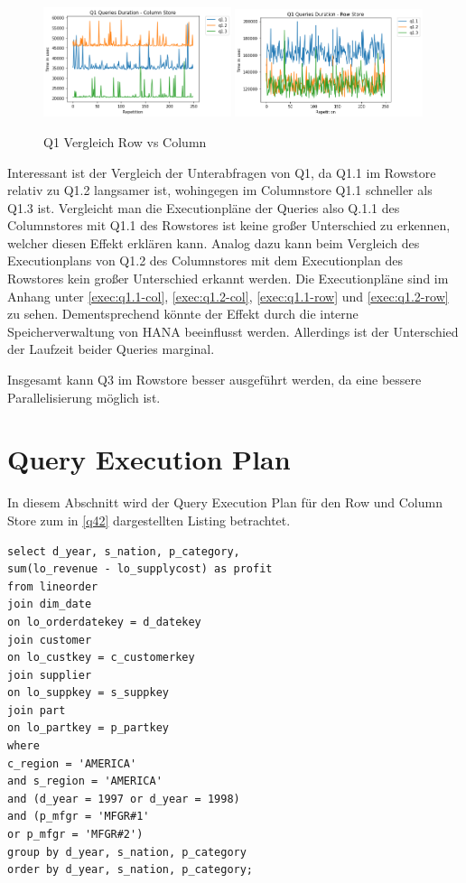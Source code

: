 \begin{figure}[H]
	\centering
	\includegraphics[width=0.49\textwidth]{images/q1-col.png}
	\includegraphics[width=0.49\textwidth]{images/q1-row.png}
	\caption{Q1 Vergleich Row vs Column}\label{auswertung:comp:q1}
\end{figure}

Interessant ist der Vergleich der Unterabfragen von Q1, da Q1.1
im Rowstore relativ zu Q1.2 langsamer ist, wohingegen im Columnstore
Q1.1 schneller als Q1.3 ist.
Vergleicht man die Executionpläne der Queries also Q.1.1 des Columnstores mit Q1.1 des Rowstores ist keine großer Unterschied zu erkennen, welcher diesen Effekt
erklären kann.
Analog dazu kann beim Vergleich des Executionplans von Q1.2 des Columnstores
mit dem Executionplan des Rowstores kein großer Unterschied erkannt werden.
Die Executionpläne sind im Anhang unter \autoref{exec:q1.1-col},
\autoref{exec:q1.2-col}, \autoref{exec:q1.1-row} und \autoref{exec:q1.2-row}
zu sehen.
Dementsprechend könnte der Effekt durch die interne Speicherverwaltung von HANA
beeinflusst werden.
Allerdings ist der Unterschied der Laufzeit beider Queries marginal.

Insgesamt kann Q3 im Rowstore besser ausgeführt werden,
da eine bessere Parallelisierung möglich ist.

\section{Query Execution Plan}
In diesem Abschnitt wird der Query Execution Plan für den Row und Column Store zum in \autoref{q42} dargestellten Listing betrachtet. 

\begin{lstlisting}[label=q42, caption={Benchmark Query 4.2}]
select d_year, s_nation, p_category,
sum(lo_revenue - lo_supplycost) as profit
from lineorder
join dim_date
on lo_orderdatekey = d_datekey
join customer
on lo_custkey = c_customerkey
join supplier
on lo_suppkey = s_suppkey
join part
on lo_partkey = p_partkey
where
c_region = 'AMERICA'
and s_region = 'AMERICA'
and (d_year = 1997 or d_year = 1998)
and (p_mfgr = 'MFGR#1'
or p_mfgr = 'MFGR#2')
group by d_year, s_nation, p_category
order by d_year, s_nation, p_category;
\end{lstlisting}

